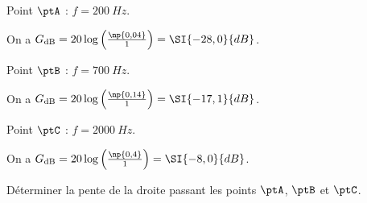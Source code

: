 
\begin{enonce}
	Point $\ptA$ : $f = \SI{200}{Hz}$. 
\end{enonce}


\begin{corrige}
		On a $G_{\text{dB}} = 20 \log \left(\frac{\np{0,04}}{1}\right)=\SI{-28,0}{dB}$.
\end{corrige}



\begin{enonce}
	Point $\ptB$ : $f = \SI{700}{Hz}$. 
\end{enonce}


\begin{corrige}
	On a $G_{\text{dB}} = 20 \log \left(\frac{\np{0,14}}{1}\right)=\SI{-17,1}{dB}$.
\end{corrige}



\begin{enonce}
	Point $\ptC$ : $f = \SI{2000}{Hz}$.
\end{enonce}


\begin{corrige}
	On a $G_{\text{dB}} = 20 \log \left(\frac{\np{0,4}}{1}\right)=\SI{-8,0}{dB}$.
\end{corrige}



\begin{enonce}
	Déterminer la pente de la droite passant les points $\ptA$, $\ptB$ et $\ptC$.
\end{enonce}

